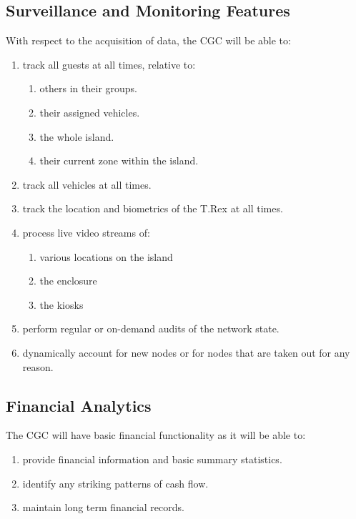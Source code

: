 \documentclass[12pt]{article}
\begin{document}
    \subsection{Surveillance and Monitoring Features} With respect to the acquisition of 
    data, the CGC will be able to:
    \begin{enumerate}
        \item track all guests at all times, relative to:
            \begin{enumerate}
                \item others in their groups.
                \item their assigned vehicles.
                \item the whole island.
                \item their current zone within the island.
            \end{enumerate}
        \item track all vehicles at all times.
        \item track the location and biometrics of the T.Rex at all times.
        \item process live video streams of:
            \begin{enumerate}
                \item various locations on the island
                \item the enclosure
                \item the kiosks
            \end{enumerate}
        \item perform regular or on-demand audits of the network state.
        \item dynamically account for new nodes or for nodes that are
        taken out for any reason.
    \end{enumerate}
    
    \subsection{Financial Analytics} The CGC will have basic financial functionality as it will
    be able to:
    \begin{enumerate}
        \item provide financial information and basic summary statistics.
        \item identify any striking patterns of cash flow.
        \item maintain long term financial records.
    \end{enumerate}
\end{document}
